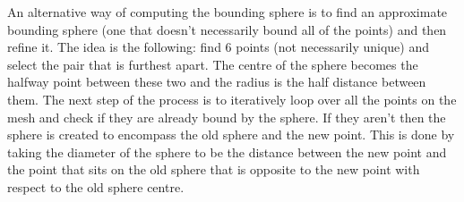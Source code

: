     An alternative way of computing the bounding sphere is to find an
    approximate bounding sphere (one that doesn't necessarily bound all of
    the points) and then refine it. The idea is the following: find 6 points
    (not necessarily unique) and select the pair that is furthest apart. The
    centre of the sphere becomes the halfway point between these two and the
    radius is the half distance between them. The next step of the process
    is to iteratively loop over all the points on the mesh and check if they
    are already bound by the sphere. If they aren't then the sphere is
    created to encompass the old sphere and the new point. This is done by
    taking the diameter of the sphere to be the distance between the new
    point and the point that sits on the old sphere that is opposite to the
    new point with respect to the old sphere centre.
